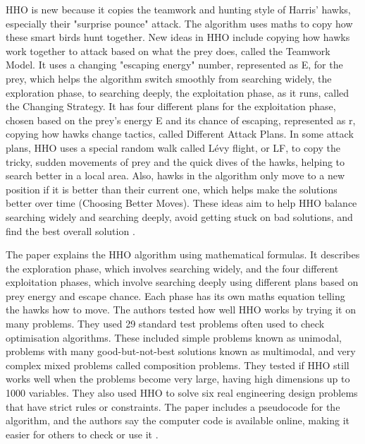 \documentclass[a4paper, 12pt]{extarticle}
\begin{document}
HHO is new because it copies the teamwork and hunting style of Harris' hawks, especially their "surprise pounce" attack. The algorithm uses maths to copy how these smart birds hunt together. New ideas in HHO include copying how hawks work together to attack based on what the prey does, called the Teamwork Model. It uses a changing "escaping energy" number, represented as E, for the prey, which helps the algorithm switch smoothly from searching widely, the exploration phase, to searching deeply, the exploitation phase, as it runs, called the Changing Strategy. It has four different plans for the exploitation phase, chosen based on the prey's energy E and its chance of escaping, represented as r, copying how hawks change tactics, called Different Attack Plans. In some attack plans, HHO uses a special random walk called Lévy flight, or LF, to copy the tricky, sudden movements of prey and the quick dives of the hawks, helping to search better in a local area. Also, hawks in the algorithm only move to a new position if it is better than their current one, which helps make the solutions better over time (Choosing Better Moves). These ideas aim to help HHO balance searching widely and searching deeply, avoid getting stuck on bad solutions, and find the best overall solution \cite{heidari2019harris}.

The paper explains the HHO algorithm using mathematical formulas. It describes the exploration phase, which involves searching widely, and the four different exploitation phases, which involve searching deeply using different plans based on prey energy and escape chance. Each phase has its own maths equation telling the hawks how to move. The authors tested how well HHO works by trying it on many problems. They used 29 standard test problems often used to check optimisation algorithms. These included simple problems known as unimodal, problems with many good-but-not-best solutions known as multimodal, and very complex mixed problems called composition problems. They tested if HHO still works well when the problems become very large, having high dimensions up to 1000 variables. They also used HHO to solve six real engineering design problems that have strict rules or constraints. The paper includes a pseudocode for the algorithm, and the authors say the computer code is available online, making it easier for others to check or use it \cite{heidari2019harris}.
\end{document}
